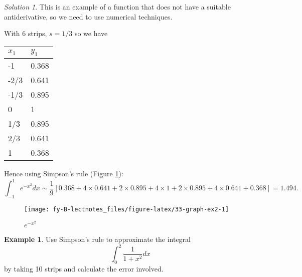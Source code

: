 \documentclass[
  11pt,
  oneside]{book}
\newcommand{\slide}{}
\theoremstyle{definition}
\theoremstyle{definition}
\newtheorem{example}{Example}[chapter]
\theoremstyle{definition}
\theoremstyle{definition}
\theoremstyle{remark}
\newtheorem*{solution}{Solution}
\begin{document}
\begin{solution}

This is an example of a function that does not have a suitable antiderivative, so we need to use numerical techniques.

With 6 strips, \(s=1/3\) so we have

\begin{tabular}{l|l}
\hline
$x_1$ & $y_1$\\
\hline
-1 & 0.368\\
\hline
-2/3 & 0.641\\
\hline
-1/3 & 0.895\\
\hline
0 & 1\\
\hline
1/3 & 0.895\\
\hline
2/3 & 0.641\\
\hline
1 & 0.368\\
\hline
\end{tabular}

Hence using Simpson's rule (Figure \ref{fig:33-graph-ex2}):
\[
\int_{-1}^1e^{-x^2}dx \sim \frac19\left[0.368 + 4\times0.641+2\times0.895+4\times1+2\times0.895+4\times0.641+0.368\right] = 1.494.
\]

\begin{figure}

{\centering \texttt{[image: fy-B-lectnotes\_files/figure-latex/33-graph-ex2-1]} 

}

\caption{$e^{-x^2}$}\label{fig:33-graph-ex2}
\end{figure}

\end{solution}

\slide

\begin{example}
Use Simpson's rule to approximate the integral
\[
\int_0^2\frac1{1+x^2}dx
\]
by taking 10 strips and calculate the error involved.
\end{example}
\end{document}
